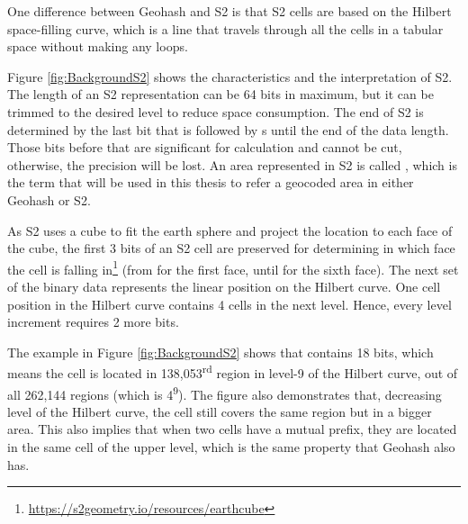 \npara One difference between Geohash and S2 is that S2 cells are based on the Hilbert space-filling curve, which is a line that travels through all the cells in a tabular space without making any loops.

\npara Figure \ref{fig:BackgroundS2} shows the characteristics and the interpretation of S2.
The length of an S2 representation can be 64 bits in maximum, but it can be trimmed to the desired level to reduce space consumption.
The end of S2 is determined by the last bit  that is followed by s until the end of the data length.
Those bits before that are significant for calculation and cannot be cut, otherwise, the precision will be lost.
An area represented in S2 is called , which is the term that will be used in this thesis to refer a geocoded area in either Geohash or S2.

\npara As S2 uses a cube to fit the earth sphere and project the location to each face of the cube, the first 3 bits of an S2 cell are preserved for determining in which face the cell is falling in\footnote{\url{https://s2geometry.io/resources/earthcube}} (from  for the first face, until  for the sixth face).
The next set of the binary data represents the linear position on the Hilbert curve.
One cell position in the Hilbert curve contains 4 cells in the next level.
Hence, every level increment requires 2 more bits.

\npara The example in Figure \ref{fig:BackgroundS2} shows that  contains 18 bits, which means the cell is located in 138,053\textsuperscript{rd} region in level-9 of the Hilbert curve, out of all 262,144 regions (which is 4\textsuperscript{9}).
The figure also demonstrates that, decreasing level of the Hilbert curve, the cell still covers the same region but in a bigger area.
This also implies that when two cells have a mutual prefix, they are located in the same cell of the upper level, which is the same property that Geohash also has.

